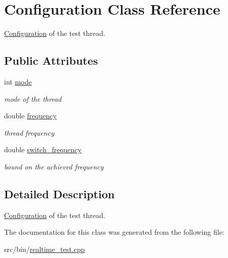 \hypertarget{classConfiguration}{}\section{Configuration Class Reference}
\label{classConfiguration}


\hyperlink{classConfiguration}{Configuration} of the test thread.  


\subsection*{Public Attributes}
\begin{DoxyCompactItemize}
\item 
int \hyperlink{classConfiguration_a7d5f2036941892a92f343c50a1606b4d}{mode}\hypertarget{classConfiguration_a7d5f2036941892a92f343c50a1606b4d}{}\label{classConfiguration_a7d5f2036941892a92f343c50a1606b4d}

\begin{DoxyCompactList}\small\item\em mode of the thread \end{DoxyCompactList}\item 
double \hyperlink{classConfiguration_ac6f09be53002bfb5404a241b3ce5486e}{frequency}\hypertarget{classConfiguration_ac6f09be53002bfb5404a241b3ce5486e}{}\label{classConfiguration_ac6f09be53002bfb5404a241b3ce5486e}

\begin{DoxyCompactList}\small\item\em thread frequency \end{DoxyCompactList}\item 
double \hyperlink{classConfiguration_abeda8dee257cb5a21afa2d1f6fab758c}{switch\+\_\+frequency}\hypertarget{classConfiguration_abeda8dee257cb5a21afa2d1f6fab758c}{}\label{classConfiguration_abeda8dee257cb5a21afa2d1f6fab758c}

\begin{DoxyCompactList}\small\item\em bound on the achieved frequency \end{DoxyCompactList}\end{DoxyCompactItemize}


\subsection{Detailed Description}
\hyperlink{classConfiguration}{Configuration} of the test thread. 

The documentation for this class was generated from the following file\+:\begin{DoxyCompactItemize}
\item 
src/bin/\hyperlink{realtime__test_8cpp}{realtime\+\_\+test.\+cpp}\end{DoxyCompactItemize}
